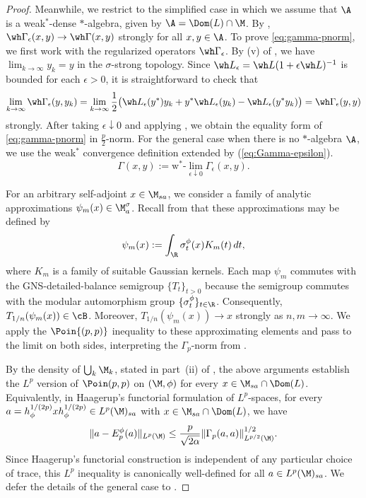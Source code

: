 \documentclass[sn-mathphys-num]{sn-jnl}
\begin{document}
\begin{proof}
 Meanwhile, we restrict to the simplified case in which we assume that $\A$ is a weak$^*$-dense $*$-algebra, given by $\A = \Dom(L)\cap \M$. By , $\wh\Gamma_\epsilon(x,y)\to \wh\Gamma(x,y)$ strongly for all $x,y\in\A$.
To prove \cref{eq:gamma-pnorm}, we first work with the regularized operators $\wh\Gamma_\epsilon$. By (v) of , we have $\lim_{k\to\infty} y_k = y$ in the $\sigma$-strong topology. Since
$
\wh L_\epsilon = \wh L(1+\epsilon \wh L)^{-1}
$
is bounded for each $\epsilon>0$, it is straightforward to check that
\begin{equation}\label{eq:strong-gamma}
      \lim_{k\to\infty}\wh\Gamma_\epsilon(y,y_k)
    = \lim_{k\to\infty}\frac12\bigl(
        \wh L_\epsilon(y^*)  y_k
        + y^* \wh L_\epsilon(y_k)
        - \wh L_\epsilon(y^* y_k)
    \bigr)
    = \wh\Gamma_\epsilon(y,y)
\end{equation}
strongly.
After taking $\epsilon\downarrow 0$ and applying , we obtain the equality form of \cref{eq:gamma-pnorm} in $\frac{p}{2}$-norm. For the general case when there is no $*$-algebra $\A$, we use the weak$^*$ convergence definition extended by \cite[Lemma~9.1]{cipriani_derivations_2003} (\cref{eq:Gamma-epsilon}).
\[
\Gamma(x,y):=\mathrm{w}^*\text{-}   \lim_{\epsilon\downarrow0}\Gamma_\epsilon(x,y).
\]


For an arbitrary self-adjoint $x\in\M_{sa}$, we consider a family of analytic approximations $\psi_m(x)\in\M_a^\sigma$.
Recall from \cite[Chap.~VIII.2.3]{takesaki_theory_2003-2} that these approximations may be defined by
\[
\psi_m(x):=\int_\R \sigma_t^\phi(x)K_m(t)\,dt,
\]
where $K_m$ is a family of suitable Gaussian kernels.
Each map $\psi_m$ commutes with the GNS-detailed-balance semigroup
$\{T_t\}_{t>0}$ because the semigroup commutes with the modular automorphism group $\{\sigma_t^\phi\}_{t\in\R}$.
Consequently, $T_{1/n}(\psi_m(x))\in\cB$.
Moreover, $T_{1/n}(\psi_m(x))\to x$ strongly as $n,m\to\infty$.
We apply the $\Poin{(p,p)}$ inequality to these approximating elements and pass to the limit on both sides, interpreting the $\Gamma_p$-norm from .

By the density of $\bigcup_k\M_k$, stated in part~(ii) of , the above arguments establish the $L^p$ version of $\Poin(p,p)$ on $(\M,\phi)$ for every $x\in\M_{sa}\cap\Dom(L)$.
Equivalently, in Haagerup's functorial formulation of $L^p$-spaces, for every
$a=h_\phi^{1/(2p)}x h_\phi^{1/(2p)}\in L^p(\M)_{sa}$ with
$x\in\M_{sa}\cap\Dom(L)$, we have
\[
\|a-E_p^\phi(a)\|_{L^p(\M)}
\leq
\frac{p}{\sqrt{2\alpha}}
\|\Gamma_p(a,a)\|_{L^{p/2}(\M)}^{1/2}.
\]
Since Haagerup's functorial construction is independent of any particular choice of trace, this $L^p$ inequality is canonically well-defined for all $a\in L^p(\M)_{sa}$.
We defer the details of the general case to .
\end{proof}
\end{document}

